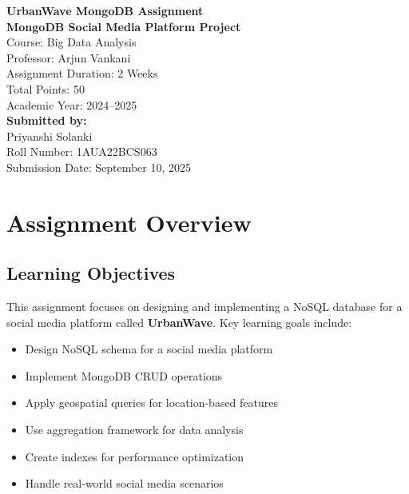 \documentclass[12pt,a4paper]{article}
\begin{document}
\begin{center}
    \Huge \textbf{UrbanWave MongoDB Assignment} \\
    \vspace{0.5cm}
    \Large \textbf{MongoDB Social Media Platform Project} \\
    \vspace{1cm}
    Course: Big Data Analysis \\
    Professor: Arjun Vankani \\
    \vspace{0.5cm}
    Assignment Duration: 2 Weeks \\
    Total Points: 50 \\
    Academic Year: 2024--2025 \\
    \vspace{2cm}
    \Large \textbf{Submitted by:} \\
    Priyanshi Solanki \\
    Roll Number: 1AUA22BCS063 \\
    \vspace{1cm}
    Submission Date: September 10, 2025 \\
\end{center}

\newpage

\tableofcontents
\newpage

\section{Assignment Overview}
\subsection{Learning Objectives}
This assignment focuses on designing and implementing a NoSQL database for a social media platform called \textbf{UrbanWave}. Key learning goals include:
\begin{itemize}
    \item Design NoSQL schema for a social media platform
    \item Implement MongoDB CRUD operations
    \item Apply geospatial queries for location-based features
    \item Use aggregation framework for data analysis
    \item Create indexes for performance optimization
    \item Handle real-world social media scenarios
\end{itemize}
\end{document}
